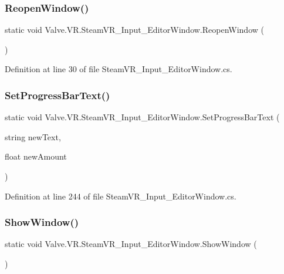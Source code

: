 \subsubsection{\texorpdfstring{ReopenWindow()}{ReopenWindow()}}
{\footnotesize\ttfamily static void Valve.\+V\+R.\+Steam\+V\+R\+\_\+\+Input\+\_\+\+Editor\+Window.\+Reopen\+Window (\begin{DoxyParamCaption}{ }\end{DoxyParamCaption})\hspace{0.3cm}{\ttfamily [static]}}



Definition at line 30 of file Steam\+V\+R\+\_\+\+Input\+\_\+\+Editor\+Window.\+cs.

\mbox{\label{class_valve_1_1_v_r_1_1_steam_v_r___input___editor_window_a2636f1bb7d713478c9660b1f0a183380}} 
\subsubsection{\texorpdfstring{SetProgressBarText()}{SetProgressBarText()}}
{\footnotesize\ttfamily static void Valve.\+V\+R.\+Steam\+V\+R\+\_\+\+Input\+\_\+\+Editor\+Window.\+Set\+Progress\+Bar\+Text (\begin{DoxyParamCaption}\item[{string}]{new\+Text,  }\item[{float}]{new\+Amount }\end{DoxyParamCaption})\hspace{0.3cm}{\ttfamily [static]}}



Definition at line 244 of file Steam\+V\+R\+\_\+\+Input\+\_\+\+Editor\+Window.\+cs.

\mbox{\label{class_valve_1_1_v_r_1_1_steam_v_r___input___editor_window_a6c00ad119684854607a322588bc46c0b}} 
\subsubsection{\texorpdfstring{ShowWindow()}{ShowWindow()}}
{\footnotesize\ttfamily static void Valve.\+V\+R.\+Steam\+V\+R\+\_\+\+Input\+\_\+\+Editor\+Window.\+Show\+Window (\begin{DoxyParamCaption}{ }\end{DoxyParamCaption})\hspace{0.3cm}{\ttfamily [static]}}




